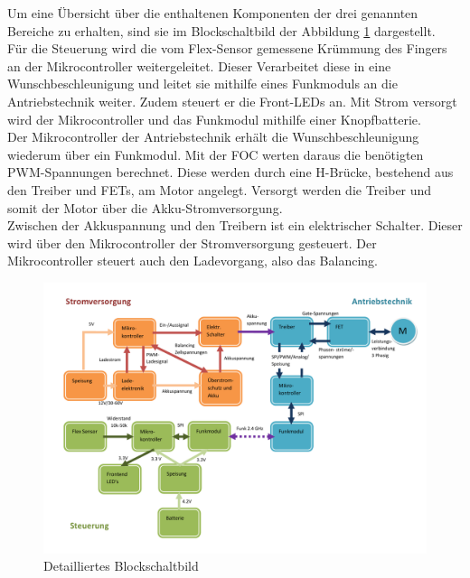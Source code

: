 Um eine Übersicht über die enthaltenen Komponenten der drei genannten Bereiche zu erhalten, sind sie im Blockschaltbild der Abbildung \ref{fig:grobkonzeptblockschaltbilddetailliert} dargestellt. \\
Für die Steuerung wird die vom Flex-Sensor gemessene Krümmung des Fingers an der Mikrocontroller weitergeleitet. Dieser Verarbeitet diese in eine Wunschbeschleunigung und leitet sie mithilfe eines Funkmoduls an die Antriebstechnik weiter. Zudem steuert er die Front-LEDs an. Mit Strom versorgt wird der Mikrocontroller und das Funkmodul mithilfe einer Knopfbatterie. \\
Der Mikrocontroller der Antriebstechnik erhält die Wunschbeschleunigung wiederum über ein Funkmodul. Mit der FOC werten daraus die benötigten PWM-Spannungen berechnet. Diese werden durch eine H-Brücke, bestehend aus den Treiber und FETs, am Motor angelegt. Versorgt werden die Treiber und somit der Motor über die Akku-Stromversorgung. \\
Zwischen der Akkuspannung und den Treibern ist ein elektrischer Schalter. Dieser wird über den Mikrocontroller der Stromversorgung gesteuert. Der Mikrocontroller steuert auch den Ladevorgang, also das Balancing. 

\begin{figure}[h]
	\centering
	\includegraphics[width=\linewidth]{images/Grobkonzept_Blockschaltbild_detailliert}
	\caption[Detailliertes Blockschaltbild]{Detailliertes Blockschaltbild}
	\label{fig:grobkonzeptblockschaltbilddetailliert}
\end{figure}

